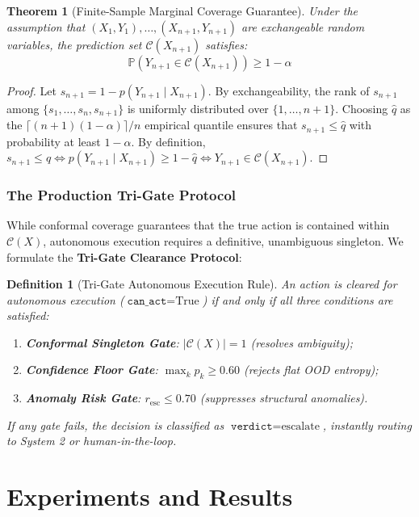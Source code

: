 \documentclass[11pt,a4paper]{article}
\newtheorem{theorem}{Theorem}
\newtheorem{definition}{Definition}
\begin{document}
\begin{theorem}[Finite-Sample Marginal Coverage Guarantee]
\label{thm:conformal}
Under the assumption that $(X_1, Y_1), \dots, (X_{n+1}, Y_{n+1})$ are exchangeable random variables, the prediction set $\mathcal{C}(X_{n+1})$ satisfies:
\begin{equation}
\mathbb{P}\left( Y_{n+1} \in \mathcal{C}(X_{n+1}) \right) \ge 1 - \alpha
\end{equation}
\end{theorem}
\begin{proof}
Let $s_{n+1} = 1 - p(Y_{n+1} \mid X_{n+1})$. By exchangeability, the rank of $s_{n+1}$ among $\{s_1, \dots, s_n, s_{n+1}\}$ is uniformly distributed over $\{1, \dots, n+1\}$. Choosing $\hat{q}$ as the $\lceil (n+1)(1-\alpha) \rceil / n$ empirical quantile ensures that $s_{n+1} \le \hat{q}$ with probability at least $1 - \alpha$. By definition, $s_{n+1} \le \hat{q} \iff p(Y_{n+1} \mid X_{n+1}) \ge 1 - \hat{q} \iff Y_{n+1} \in \mathcal{C}(X_{n+1})$.
\end{proof}

\subsubsection{The Production Tri-Gate Protocol}
While conformal coverage guarantees that the true action is contained within $\mathcal{C}(X)$, autonomous execution requires a definitive, unambiguous singleton. We formulate the \textbf{Tri-Gate Clearance Protocol}:
\begin{definition}[Tri-Gate Autonomous Execution Rule]
An action is cleared for autonomous execution ($\texttt{can\_act} = \text{True}$) if and only if all three conditions are satisfied:
\begin{enumerate}
    \item \textbf{Conformal Singleton Gate}: $|\mathcal{C}(X)| = 1$ (resolves ambiguity);
    \item \textbf{Confidence Floor Gate}: $\max_k p_k \ge 0.60$ (rejects flat OOD entropy);
    \item \textbf{Anomaly Risk Gate}: $r_{\text{esc}} \le 0.70$ (suppresses structural anomalies).
\end{enumerate}
If any gate fails, the decision is classified as $\texttt{verdict} = \text{escalate}$, instantly routing to System 2 or human-in-the-loop.
\end{definition}

\section{Experiments and Results}
\end{document}
